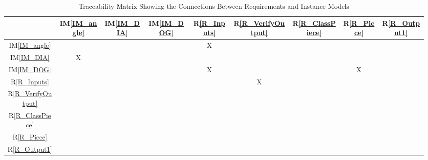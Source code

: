 \documentclass[12pt]{article}
\newcommand{\iref}[1]{IM\ref{#1}}
\newcommand{\rref}[1]{R\ref{#1}}
\begin{document}
	\begin{table}[h!]
		\centering
		\begin{tabular}{|c|c|c|c|c|c|c|c|c|}
			\hline
			& \iref{IM_angle}& \iref{IM_DIA}& \iref{IM_DOG}& \rref{R_Inputs}& \rref{R_VerifyOutput}& \rref{R_ClassPiece}& \rref{R_Piece}& \rref{R_Output1}\\
			\hline
			\iref{IM_angle}            & & & & X& & & &\\ \hline
			\iref{IM_DIA}            & X& & & & & & &\\ \hline
			\iref{IM_DOG}          & & & & X& & &X &\\ \hline
			\rref{R_Inputs}          & & & & & X& & &\\ \hline
			\rref{R_VerifyOutput}    & & & & & & & &\\ \hline
			\rref{R_ClassPiece}   & & & & & & & &\\ \hline
			\rref{R_Piece}    & & & & & & & &\\ \hline
			\rref{R_Output1}  & & & & & & & &\\ \hline
		\end{tabular}
		\caption{Traceability Matrix Showing the Connections Between Requirements and Instance Models}
		\label{Table:R_trace}
	\end{table}
	
	
	
	
	
\end{document}
